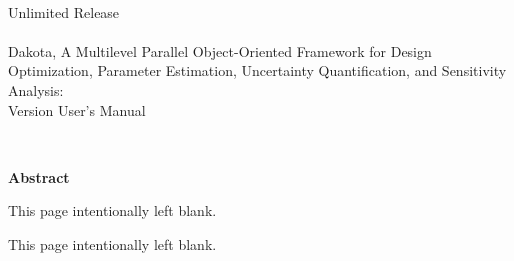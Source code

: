 \documentclass[letterpaper]{book}
\makeatletter
\def\emptypage@emptypage{%
  \hbox{}\vspace*{\fill}
  \begin{center}
    This page intentionally left blank.
  \end{center}
  \vspace{\fill}\newpage%
}%
\def\cleardoublepage{%
  \clearpage%
  \if@twoside%
  \ifodd\c@page%
  \else\emptypage@emptypage%
  \fi%
  \fi%
}%
\makeatother
\begin{document}
\begin{titlepage}
\setcounter{page}{3}
\begin{center}
{\large \DakotaSANDUsers}\\
{\large Unlimited Release}\\
{\large \DakotaSANDDate}\\

\vspace*{1.5cm}
{\LARGE Dakota, A Multilevel Parallel Object-Oriented Framework for 
Design Optimization, Parameter Estimation, Uncertainty Quantification, 
and Sensitivity Analysis:\\Version \DakotaVersion\space User's Manual}\\
\vspace*{1cm}

\DakotaAuthorUsersSAND
\\ \vspace*{0.5cm}
\DakotaSNLAddress

\newpage

{\Large \bf Abstract}
\end{center}

\DakotaAbstractShared
\DakotaAbstractUsers

\end{titlepage}

\cleardoublepage
\tableofcontents
\cleardoublepage

\setcounter{secnumdepth}{-1} %

\setcounter{secnumdepth}{3} %























\end{document}
